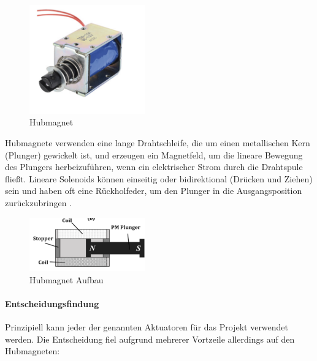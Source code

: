 \begin{figure}[htbp]
	\centering
	\includegraphics[width=5cm]{img/Hubmagnet}
	\caption{Hubmagnet \cite*{rei.ReicheltLinearerServomotor.}}
	\label{fig:Hubmagnet}
\end{figure}

Hubmagnete verwenden eine lange
Drahtschleife, die um einen metallischen Kern (Plunger) gewickelt ist, und erzeugen ein Magnetfeld, um die lineare Bewegung
des Plungers herbeizuführen, wenn ein elektrischer Strom durch die Drahtspule fließt. Lineare Solenoids können einseitig oder
bidirektional (Drücken und Ziehen) sein und haben oft eine Rückholfeder, um den Plunger in die Ausgangsposition zurückzubringen \cite*[vgl.][Kapitel 1-2]{SolenoidDesign}.

\begin{figure}[htbp]
	\centering
	\includegraphics[width=5cm]{img/AufbauMagnet}
	\caption{Hubmagnet Aufbau \cite*{SolenoidDesign}}
	\label{fig:HubmagnetAufbau}
\end{figure}

\paragraph{Entscheidungsfindung}
Prinzipiell kann jeder der genannten Aktuatoren für das Projekt verwendet werden. Die Entscheidung fiel aufgrund
mehrerer Vortzeile allerdings auf den Hubmagneten:

